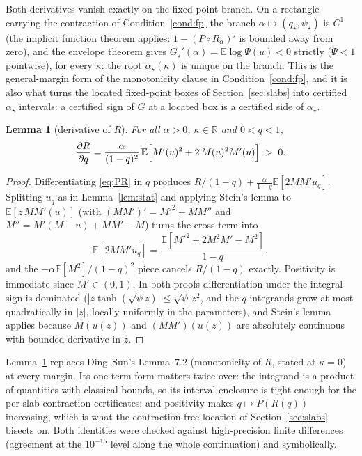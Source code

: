 \documentclass[11pt]{article}
\newtheorem{lemma}{Lemma}
\theoremstyle{remark}
\newcommand{\E}{\mathbb{E}}
\newcommand{\R}{\mathbb{R}}
\begin{document}
Both derivatives vanish exactly on the fixed-point branch.  On a
rectangle carrying the contraction of Condition~\ref{cond:fp} the
branch $\alpha\mapsto(q_\star,\psi_\star)$ is $C^1$ (the implicit
function theorem applies: $1-(P\circ R_\alpha)'$ is bounded away
from zero), and the envelope theorem gives
$G_\star'(\alpha)=\E\log\Psi(u)<0$ strictly ($\Psi<1$ pointwise), for
every $\kappa$: the root $\alpha_\star(\kappa)$ is unique on the
branch.  This is the
general-margin form of the monotonicity clause in
Condition~\ref{cond:fp}, and it is also what turns the located
fixed-point boxes of Section~\ref{sec:slabs} into certified
$\alpha_\star$ intervals: a certified sign of $G$ at a located box is
a certified side of $\alpha_\star$.

\begin{lemma}[derivative of $R$]\label{lem:dR}
For all $\alpha>0$, $\kappa\in\R$ and $0<q<1$,
\[
\frac{\partial R}{\partial q}
=\frac{\alpha}{(1-q)^2}\,
\E\Bigl[M'(u)^2+2\,M(u)^2M'(u)\Bigr]\;>\;0 .
\]
\end{lemma}

\begin{proof}
Differentiating \eqref{eq:PR} in $q$ produces
$R/(1-q)+\tfrac{\alpha}{1-q}\E[2MM'u_q]$.  Splitting $u_q$ as in
Lemma~\ref{lem:stat} and applying Stein's lemma to
$\E[z\,MM'(u)]$ (with $(MM')'=M'^2+MM''$ and
$M''=M'(M-u)+MM'-M$) turns the cross term into
\[
\E[2MM'u_q]=\frac{\E[M'^2+2M^2M'-M^2]}{1-q},
\]
and the $-\alpha\E[M^2]/(1-q)^2$ piece cancels $R/(1-q)$ exactly.
Positivity is immediate since $M'\in(0,1)$.  In both proofs
differentiation under the integral sign is dominated
($|z\tanh(\sqrt\psi z)|\le\sqrt\psi\,z^2$, and the $q$-integrands
grow at most quadratically in $|z|$, locally uniformly in the
parameters), and Stein's lemma applies because $M(u(z))$ and
$(MM')(u(z))$ are absolutely continuous with bounded derivative in
$z$.
\end{proof}

Lemma~\ref{lem:dR} replaces Ding--Sun's Lemma~7.2 (monotonicity of
$R$, stated at $\kappa=0$) at every margin.  Its one-term form
matters twice over: the integrand is a product of quantities with
classical bounds, so its interval enclosure is tight enough for the
per-slab contraction certificates; and positivity makes
$q\mapsto P(R(q))$ increasing, which is what the contraction-free
location of Section~\ref{sec:slabs} bisects on.  Both identities were
checked against high-precision finite differences (agreement at the
$10^{-15}$ level along the whole continuation) and symbolically.
\end{document}
